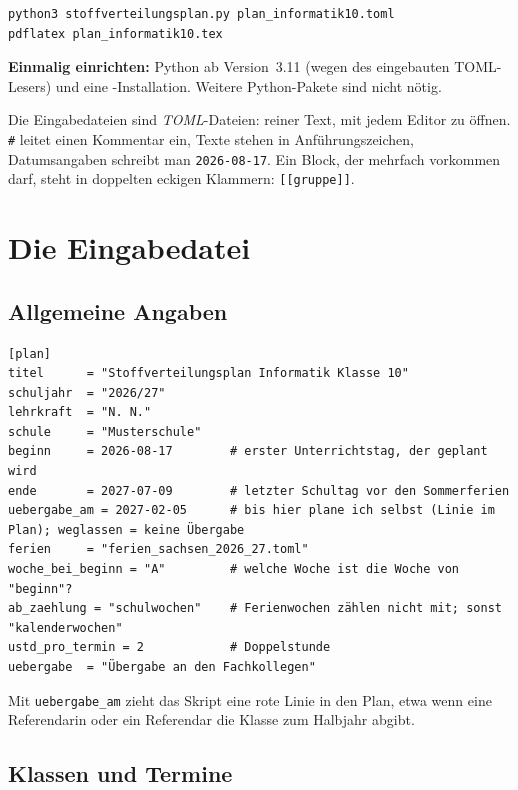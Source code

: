 \begin{lstlisting}[style=latex]
python3 stoffverteilungsplan.py plan_informatik10.toml
pdflatex plan_informatik10.tex
\end{lstlisting}

\textbf{Einmalig einrichten:} Python ab Version~3.11 (wegen des eingebauten TOML-Lesers) und eine -Installation. Weitere Python-Pakete sind nicht nötig.

\begin{hinweis}[TOML]
	Die Eingabedateien sind \textit{TOML}-Dateien: reiner Text, mit jedem Editor zu öffnen. \texttt{\#} leitet einen Kommentar ein, Texte stehen in Anführungszeichen, Datumsangaben schreibt man \texttt{2026-08-17}. Ein Block, der mehrfach vorkommen darf, steht in doppelten eckigen Klammern: \texttt{[[gruppe]]}.
\end{hinweis}



\section{Die Eingabedatei}


\subsection{Allgemeine Angaben}

\begin{lstlisting}[style=latex]
[plan]
titel      = "Stoffverteilungsplan Informatik Klasse 10"
schuljahr  = "2026/27"
lehrkraft  = "N. N."
schule     = "Musterschule"
beginn     = 2026-08-17        # erster Unterrichtstag, der geplant wird
ende       = 2027-07-09        # letzter Schultag vor den Sommerferien
uebergabe_am = 2027-02-05      # bis hier plane ich selbst (Linie im Plan); weglassen = keine Übergabe
ferien     = "ferien_sachsen_2026_27.toml"
woche_bei_beginn = "A"         # welche Woche ist die Woche von "beginn"?
ab_zaehlung = "schulwochen"    # Ferienwochen zählen nicht mit; sonst "kalenderwochen"
ustd_pro_termin = 2            # Doppelstunde
uebergabe  = "Übergabe an den Fachkollegen"
\end{lstlisting}

Mit \texttt{uebergabe\_am} zieht das Skript eine rote Linie in den Plan, etwa wenn eine Referendarin oder ein Referendar die Klasse zum Halbjahr abgibt.


\subsection{Klassen und Termine}

